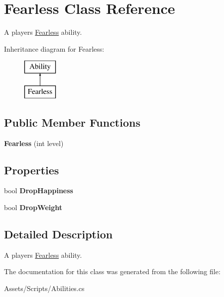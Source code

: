 \hypertarget{class_fearless}{}\section{Fearless Class Reference}
\label{class_fearless}


A player\textquotesingle{}s \hyperlink{class_fearless}{Fearless} ability.  


Inheritance diagram for Fearless\+:\begin{figure}[H]
\begin{center}
\leavevmode
\includegraphics[height=2.000000cm]{class_fearless}
\end{center}
\end{figure}
\subsection*{Public Member Functions}
\begin{DoxyCompactItemize}
\item 
{\bfseries Fearless} (int level)\hypertarget{class_fearless_a499c79319b3238fff7c2ae563f3491f4}{}\label{class_fearless_a499c79319b3238fff7c2ae563f3491f4}

\end{DoxyCompactItemize}
\subsection*{Properties}
\begin{DoxyCompactItemize}
\item 
bool {\bfseries Drop\+Happiness}\hypertarget{class_fearless_a4d6e43905dc0ecf63e083c5faf4447a1}{}\label{class_fearless_a4d6e43905dc0ecf63e083c5faf4447a1}

\item 
bool {\bfseries Drop\+Weight}\hypertarget{class_fearless_a5a8619fd14af033d934b4774889fd853}{}\label{class_fearless_a5a8619fd14af033d934b4774889fd853}

\end{DoxyCompactItemize}


\subsection{Detailed Description}
A player\textquotesingle{}s \hyperlink{class_fearless}{Fearless} ability. 



The documentation for this class was generated from the following file\+:\begin{DoxyCompactItemize}
\item 
Assets/\+Scripts/Abilities.\+cs\end{DoxyCompactItemize}
